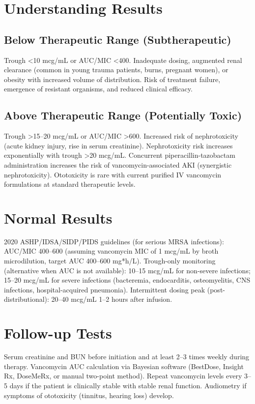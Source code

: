 \section*{Understanding Results}

\subsection*{Below Therapeutic Range (Subtherapeutic)}
Trough <10 mcg/mL or AUC/MIC <400. Inadequate dosing, augmented renal clearance (common in young trauma patients, burns, pregnant women), or obesity with increased volume of distribution. Risk of treatment failure, emergence of resistant organisms, and reduced clinical efficacy.

\subsection*{Above Therapeutic Range (Potentially Toxic)}
Trough >15--20 mcg/mL or AUC/MIC >600. Increased risk of nephrotoxicity (acute kidney injury, rise in serum creatinine). Nephrotoxicity risk increases exponentially with trough >20 mcg/mL. Concurrent piperacillin-tazobactam administration increases the risk of vancomycin-associated AKI (synergistic nephrotoxicity). Ototoxicity is rare with current purified IV vancomycin formulations at standard therapeutic levels.

\section*{Normal Results}
2020 ASHP/IDSA/SIDP/PIDS guidelines (for serious MRSA infections): AUC/MIC 400--600 (assuming vancomycin MIC of 1 mcg/mL by broth microdilution, target AUC 400--600 mg*h/L). Trough-only monitoring (alternative when AUC is not available): 10--15 mcg/mL for non-severe infections; 15--20 mcg/mL for severe infections (bacteremia, endocarditis, osteomyelitis, CNS infections, hospital-acquired pneumonia). Intermittent dosing peak (post-distributional): 20--40 mcg/mL 1--2 hours after infusion.

\section*{Follow-up Tests}
Serum creatinine and BUN before initiation and at least 2--3 times weekly during therapy. Vancomycin AUC calculation via Bayesian software (BestDose, Insight Rx, DoseMeRx, or manual two-point method). Repeat vancomycin levels every 3--5 days if the patient is clinically stable with stable renal function. Audiometry if symptoms of ototoxicity (tinnitus, hearing loss) develop.

